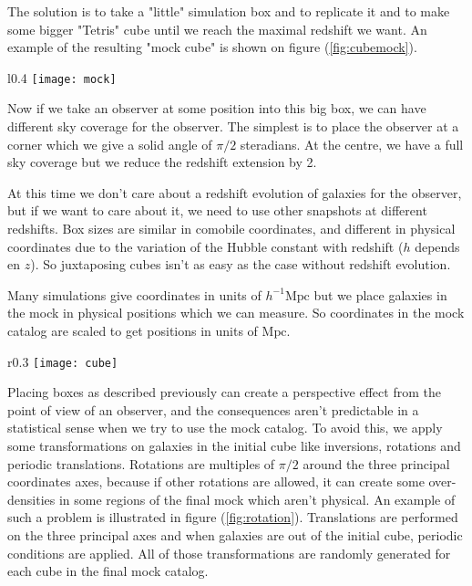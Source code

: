 The solution is to take a "little" simulation box and to replicate it and to make some bigger "Tetris" cube until we reach the
maximal redshift we want. An example of the resulting "mock cube" is shown on figure (\ref{fig:cubemock}).
\begin{wrapfigure}{l}{0.4\linewidth}
    \centering
    \texttt{[image: mock]}
    \caption{\footnotesize{}The structure of the mock catalog once we have replicated the simulation box chosen to populate dark
    matter halos.}%
    \label{fig:cubemock}
\end{wrapfigure}

Now if we take an observer at some position into this big box, we can have different sky coverage for the observer. The simplest is
to place the observer at a corner which we give a solid angle of $\pi/2$ steradians. At the centre, we have a full sky coverage but
we reduce the redshift extension by 2.

At this time we don't care about a redshift evolution of galaxies for the observer, but if we want to care about it, we need to use
other snapshots at different redshifts. Box sizes are similar in comobile coordinates, and different in physical coordinates
due to the variation of the Hubble constant with redshift ($h$ depends en $z$). So juxtaposing cubes isn't as easy as the case
without redshift evolution.

Many simulations give coordinates in units of $h^{-1}\mathrm{Mpc}$ but we place galaxies in the mock in physical positions which we
can measure. So coordinates in the mock catalog are scaled to get positions in units of $\mathrm{Mpc}$.

\begin{wrapfigure}{r}{0.3\linewidth}
    \centering
    \texttt{[image: cube]}
    \caption{Consequences of a random rotation angle on initial cube.}
\label{fig:rotation}
\end{wrapfigure}

Placing boxes as described previously can create a perspective effect from the point of view of an observer, and the consequences
aren't predictable in a statistical sense when we try to use the mock catalog. To avoid this, we apply some transformations on
galaxies in the initial cube like inversions, rotations and periodic translations. Rotations are multiples of $\pi/2$ around the
three principal coordinates axes, because if other rotations are allowed, it can create some over-densities in some regions of the
final mock which aren't physical. An example of such a problem is illustrated in figure (\ref{fig:rotation}).
Translations are performed on the three principal axes and when galaxies are out of the initial cube, periodic conditions are
applied. All of those transformations are randomly generated for each cube in the final mock catalog.

